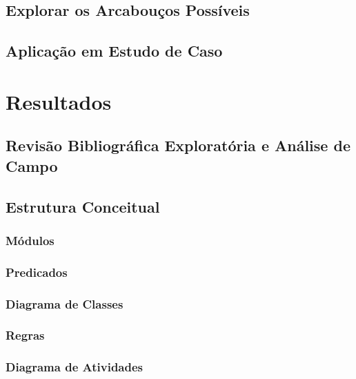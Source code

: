 \documentclass[openright]{normas-utf-tex} %
\begin{document}
    \section{Explorar os Arcabouços Possíveis} \label{possarc} 
                         
    \section{Aplicação em Estudo de Caso}    
        \label{inferencias}

\chapter{Resultados}
\label{chap:resul}
	
	\section{Revisão Bibliográfica Exploratória e Análise de Campo} \label{resrevisaoexploratoria}
		
	\section{Estrutura Conceitual} \label{estconceitual}
		
		\subsection{Módulos} \label{mods}			
			
		\subsection{Predicados}\label{predic}
			
		\subsection{Diagrama de Classes}
			
		\subsection{Regras} \label{regras}
			
		\subsection{Diagrama de Atividades} \label{umldiagram}
			
\end{document}
